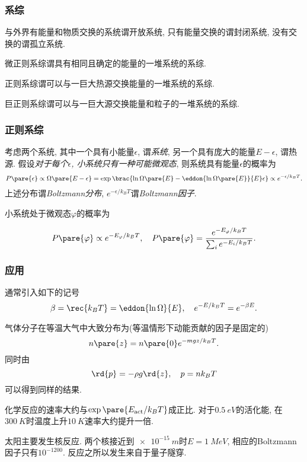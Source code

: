 \documentclass[../Thermal.tex]{subfiles}
\begin{document}
\subsubsection{系综}
\begin{definition}
与外界有能量和物质交换的系统谓开放系统, 只有能量交换的谓封闭系统, 没有交换的谓孤立系统.
\end{definition}
\begin{definition}[微正则系综]
微正则系综谓具有相同且确定的能量的一堆系统的系综.
\end{definition}
\begin{definition}[正则系综]
正则系综谓可以与一巨大热源交换能量的一堆系统的系综.
\end{definition}
\begin{definition}[巨正则系综]
巨正则系综谓可以与一巨大源交换能量和粒子的一堆系统的系综.
\end{definition}
\subsubsection{正则系综}
考虑两个系统, 其中一个具有小能量$\epsilon$, 谓\emph{系统}, 另一个具有庞大的能量$E-\epsilon$, 谓热源. 假设\emph{对于每个$\epsilon$, 小系统只有一种可能微观态}, 则系统具有能量$\epsilon$的概率为
\begin{equation}
\label{eq:boltzmanndistribution}
P\pare{\epsilon} \propto \Omega\pare{E-\epsilon} = \exp\brac{\ln\Omega\pare{E} - \eddon{\ln\Omega\pare{E}}{E}\epsilon} \propto e^{-\epsilon/k_BT}.
\end{equation}
上述分布谓\emph{Boltzmann分布}, $e^{-\epsilon/k_BT}$谓\emph{Boltzmann因子}.
\begin{corollary}
小系统处于微观态$\varphi$的概率为
\begin{finale}
\[ P\pare{\varphi} \propto e^{-E_\varphi/k_BT},\quad P\pare{\varphi} = \frac{e^{-E_\varphi/k_BT}}{\sum_i e^{-E_i/k_BT}}. \]
\end{finale}
\end{corollary}
\subsubsection{应用}
\begin{finale}
通常引入如下的记号
\[ \beta = \rec{k_B T} = \eddon{\ln\Omega}{E},\quad e^{-E/k_BT} = e^{-\beta E}. \]
\end{finale}
\begin{ex}[等温大气]
气体分子在等温大气中大致分布为(等温情形下动能贡献的因子是固定的)
\[ n\pare{z} = n\pare{0} e^{-mgz/k_BT}. \]
同时由
\[ \rd{p} = -\rho g\rd{z},\quad p=nk_BT \]
可以得到同样的结果.
\end{ex}
\begin{ex}[活化能]
化学反应的速率大约与$\exp\pare{E_{\mathrm{act}}/k_BT}$成正比. 对于$\SI{0.5}{eV}$的活化能, 在$\SI{300}{K}$时温度上升$\SI{10}{K}$速率大约提升一倍.
\end{ex}
\begin{ex}
太阳主要发生核反应. 两个核接近到$\SI{e-15}{m}$时$E=\SI{1}{MeV}$, 相应的Boltzmann因子只有$10^{-1200}$. 反应之所以发生来自于量子隧穿.
\end{ex}
\end{document}

